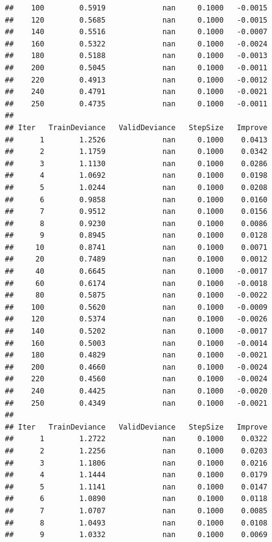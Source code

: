 \documentclass[]{book}
\begin{document}
\begin{verbatim}
##    100        0.5919             nan     0.1000   -0.0015
##    120        0.5685             nan     0.1000   -0.0015
##    140        0.5516             nan     0.1000   -0.0007
##    160        0.5322             nan     0.1000   -0.0024
##    180        0.5188             nan     0.1000   -0.0013
##    200        0.5045             nan     0.1000   -0.0011
##    220        0.4913             nan     0.1000   -0.0012
##    240        0.4791             nan     0.1000   -0.0021
##    250        0.4735             nan     0.1000   -0.0011
## 
## Iter   TrainDeviance   ValidDeviance   StepSize   Improve
##      1        1.2526             nan     0.1000    0.0413
##      2        1.1759             nan     0.1000    0.0342
##      3        1.1130             nan     0.1000    0.0286
##      4        1.0692             nan     0.1000    0.0198
##      5        1.0244             nan     0.1000    0.0208
##      6        0.9858             nan     0.1000    0.0160
##      7        0.9512             nan     0.1000    0.0156
##      8        0.9230             nan     0.1000    0.0086
##      9        0.8945             nan     0.1000    0.0128
##     10        0.8741             nan     0.1000    0.0071
##     20        0.7489             nan     0.1000    0.0012
##     40        0.6645             nan     0.1000   -0.0017
##     60        0.6174             nan     0.1000   -0.0018
##     80        0.5875             nan     0.1000   -0.0022
##    100        0.5620             nan     0.1000   -0.0009
##    120        0.5374             nan     0.1000   -0.0026
##    140        0.5202             nan     0.1000   -0.0017
##    160        0.5003             nan     0.1000   -0.0014
##    180        0.4829             nan     0.1000   -0.0021
##    200        0.4660             nan     0.1000   -0.0024
##    220        0.4560             nan     0.1000   -0.0024
##    240        0.4425             nan     0.1000   -0.0020
##    250        0.4349             nan     0.1000   -0.0021
## 
## Iter   TrainDeviance   ValidDeviance   StepSize   Improve
##      1        1.2722             nan     0.1000    0.0322
##      2        1.2256             nan     0.1000    0.0203
##      3        1.1806             nan     0.1000    0.0216
##      4        1.1444             nan     0.1000    0.0179
##      5        1.1141             nan     0.1000    0.0147
##      6        1.0890             nan     0.1000    0.0118
##      7        1.0707             nan     0.1000    0.0085
##      8        1.0493             nan     0.1000    0.0108
##      9        1.0332             nan     0.1000    0.0069

\end{verbatim}
\end{document}
